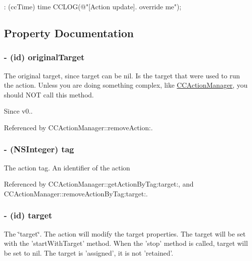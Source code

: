 \begin{DoxyCode}
              : (ccTime) time
{
        CCLOG(@"[Action update]. override me");
}
\end{DoxyCode}


\subsection{Property Documentation}
\hypertarget{interface_c_c_action_ad71b8a496d6d22b8854768276f0bb8c6}{
\subsubsection[{original\-Target}]{\setlength{\rightskip}{0pt plus 5cm}-\/ (id) {\bf original\-Target}}}\label{interface_c_c_action_ad71b8a496d6d22b8854768276f0bb8c6}
The original target, since target can be nil. Is the target that were used to run the action. Unless you are doing something complex, like \hyperlink{interface_c_c_action_manager}{C\-C\-Action\-Manager}, you should N\-O\-T call this method. \begin{DoxySince}{Since}
v0.. 
\end{DoxySince}


Referenced by C\-C\-Action\-Manager\-::remove\-Action\-:.

\hypertarget{interface_c_c_action_a944bcf8bdf05e045b48888783cfbd223}{
\subsubsection[{tag}]{\setlength{\rightskip}{0pt plus 5cm}-\/ (N\-S\-Integer) {\bf tag}}}\label{interface_c_c_action_a944bcf8bdf05e045b48888783cfbd223}
The action tag. An identifier of the action 

Referenced by C\-C\-Action\-Manager\-::get\-Action\-By\-Tag\-:target\-:, and C\-C\-Action\-Manager\-::remove\-Action\-By\-Tag\-:target\-:.

\hypertarget{interface_c_c_action_a091582cf24bddda501fb6110991fb82c}{
\subsubsection[{target}]{\setlength{\rightskip}{0pt plus 5cm}-\/ (id) {\bf target}}}\label{interface_c_c_action_a091582cf24bddda501fb6110991fb82c}
The \char`\"{}target\char`\"{}. The action will modify the target properties. The target will be set with the 'start\-With\-Target' method. When the 'stop' method is called, target will be set to nil. The target is 'assigned', it is not 'retained'. 

